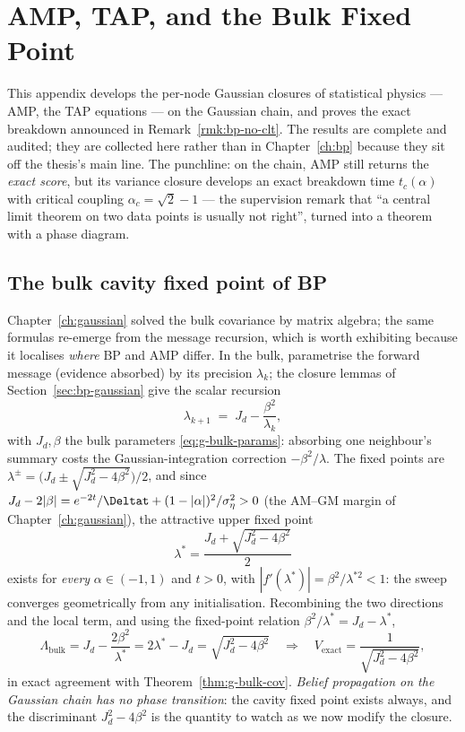 \chapter{AMP, TAP, and the Bulk Fixed Point}\label{app:amp}

This appendix develops the per-node Gaussian closures of statistical
physics --- AMP, the TAP equations --- on the Gaussian chain, and proves
the exact breakdown announced in Remark~\ref{rmk:bp-no-clt}. The results
are complete and audited; they are collected here rather than in
Chapter~\ref{ch:bp} because they sit off the thesis's main line. The
punchline: on the chain, AMP still returns the \emph{exact score}, but its
variance closure develops an exact breakdown time $t_c(\alpha)$ with
critical coupling $\alpha_c = \sqrt{2} - 1$ --- the supervision remark
that ``a central limit theorem on two data points is usually not right'',
turned into a theorem with a phase diagram.

\section{The bulk cavity fixed point of BP}\label{sec:amp-bulk-bp}

Chapter~\ref{ch:gaussian} solved the bulk covariance by matrix algebra;
the same formulas re-emerge from the message recursion, which is worth
exhibiting because it localises \emph{where} BP and AMP differ. In the
bulk, parametrise the forward message (evidence absorbed) by its precision
$\lambda_k$; the closure lemmas of Section~\ref{sec:bp-gaussian} give the
scalar recursion
\begin{equation}
  \lambda_{k+1} \;=\; J_d - \frac{\beta^2}{\lambda_k},
  \label{eq:bp-cavity}
\end{equation}
with $J_d, \beta$ the bulk parameters \eqref{eq:g-bulk-params}: absorbing
one neighbour's summary costs the Gaussian-integration correction
$-\beta^2/\lambda$. The fixed points are
$\lambda^\pm = \big( J_d \pm \sqrt{J_d^2 - 4\beta^2} \big)/2$, and since
$J_d - 2|\beta| = e^{-2t}/\Deltat + (1 - |\alpha|)^2/\sigma_\eta^2 > 0$
(the AM--GM margin of Chapter~\ref{ch:gaussian}), the attractive upper
fixed point
\begin{equation}
  \boxed{\;\lambda^\ast = \frac{J_d + \sqrt{J_d^2 - 4\beta^2}}{2}\;}
  \label{eq:bp-lambdastar}
\end{equation}
exists for \emph{every} $\alpha \in (-1,1)$ and $t > 0$, with
$|f'(\lambda^\ast)| = \beta^2/\lambda^{\ast 2} < 1$: the sweep converges
geometrically from any initialisation. Recombining the two directions and
the local term, and using the fixed-point relation
$\beta^2/\lambda^\ast = J_d - \lambda^\ast$,
\begin{equation}
  \Lambda_{\mathrm{bulk}}
  = J_d - \frac{2\beta^2}{\lambda^\ast}
  = 2\lambda^\ast - J_d
  = \sqrt{J_d^2 - 4\beta^2}
  \quad\Longrightarrow\quad
  V_{\mathrm{exact}} = \frac{1}{\sqrt{J_d^2 - 4\beta^2}} ,
  \label{eq:bp-bulkvar}
\end{equation}
in exact agreement with Theorem~\ref{thm:g-bulk-cov}. \emph{Belief
propagation on the Gaussian chain has no phase transition}: the cavity
fixed point exists always, and the discriminant $J_d^2 - 4\beta^2$ is the
quantity to watch as we now modify the closure.

